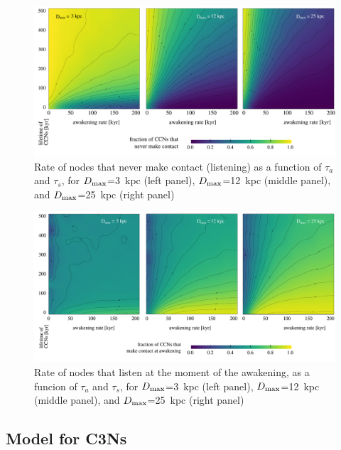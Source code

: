 \documentclass[crop]{CSLB}
\newcommand{\cetis}{C3Ns}
\begin{document}
\begin{figure} %
   \centering
   \includegraphics[width=\textwidth]{F_never_contact.pdf}
   \caption{
Rate of nodes that never make contact (listening) as a
function of $\tau_a$ and $\tau_s$, for 
$D_{\rm max}$=3~kpc (left panel),
$D_{\rm max}$=12~kpc (middle panel), and
$D_{\rm max}$=25~kpc (right panel)
%
   }
   \label{F_never_contact}
\end{figure}
 
\begin{figure} %
   \centering
   \includegraphics[width=\textwidth]{F_C_at_A.pdf}
   \caption{
Rate of nodes that listen at the moment of the
awakening, as a funcion of $\tau_a$ and $\tau_s$, for
$D_{\rm max}$=3~kpc (left panel),
$D_{\rm max}$=12~kpc (middle panel), and
$D_{\rm max}$=25~kpc (right panel)
%
   }
   \label{F_C_at_A}
\end{figure}
        

                     

\subsection{Model for \cetis{}}
\end{document}
